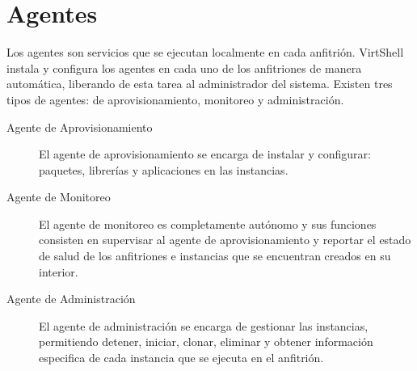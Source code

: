 \chapter{Agentes}
\label{capagents}

Los agentes son servicios que se ejecutan localmente en cada anfitrión. VirtShell instala y configura los agentes en cada uno de los anfitriones de manera automática, liberando de esta tarea al administrador del sistema. Existen tres tipos de agentes: de aprovisionamiento, monitoreo y administración.

\begin{description}
\item [Agente de Aprovisionamiento]
El agente de aprovisionamiento se encarga de instalar y configurar: paquetes, librerías y aplicaciones en las instancias. 
\item [Agente de Monitoreo]
El agente de monitoreo es completamente autónomo y sus funciones consisten en supervisar al agente de aprovisionamiento y reportar el estado de salud de los anfitriones e instancias que se encuentran creados en su interior. 
\item [Agente de Administración]
El agente de administración se encarga de gestionar las instancias, permitiendo detener, iniciar, clonar, eliminar y obtener información especifica de cada instancia que se ejecuta en el anfitrión.
\end{description}